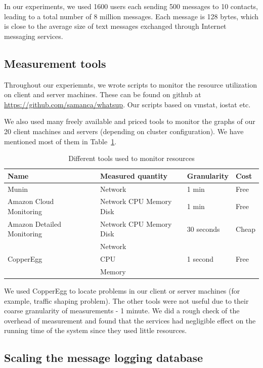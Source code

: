 \documentclass[a4paper, twocolumn]{article}
\begin{document}
In our experiments, we used 1600 users each sending 500 messages to 10 contacts, leading to a total number of 8 million messages. Each message is 128 bytes, which is close to the average size of text messages exchanged through Internet messaging services.
	
    
\subsection{Measurement tools}
Throughout our experiemnts, we wrote scripts to monitor the resource utilization on client and server machines. These can be found on github at \url{https://github.com/samanca/whatsup}. Our scripts based on vmstat, iostat etc. 


We also used many freely available and priced tools to monitor the graphs of our 20 client machines and servers (depending on cluster configuration). We have mentioned most of them in Table~\ref{tab:tools_mon}. 

\FloatBarrier
\begin{table}[b]
\centering
\begin{tabular}{|l|l|l|l|}
\hline
\bf{Name} & \bf{Measured quantity} & \bf{Granularity} & \bf{Cost}\\
\hline
Munin~\cite{tools_munin}& Network&1 min & Free\\
\hline
Amazon Cloud Monitoring~\cite{tools_amazonc}& Network CPU Memory Disk & 1 min & Free\\
\hline
Amazon Detailed Monitoring~\cite{tools_amazond}& Network CPU Memory Disk& 30 seconds & Cheap\\
\hline
\multirow{3}{*}{CopperEgg~\cite{tools_copper}}& {Network} & \multirow{3}{*}{1 second} & \multirow{3}{*}{Free}\\
& CPU & & \\
& Memory & & \\
\hline
\end{tabular}
\caption{\label{tab:tools_mon}Different tools used to monitor resources}
\end{table}


We used CopperEgg to locate problems in our client or server machines (for example, traffic shaping problem). The other tools were not useful due to their coarse granularity of measurements - 1 minute. We did a rough check of the overhead of measurement and found that the services had negligible effect on the running time of the system since they used little resources. 

\subsection{Scaling the message logging database}
\end{document}
